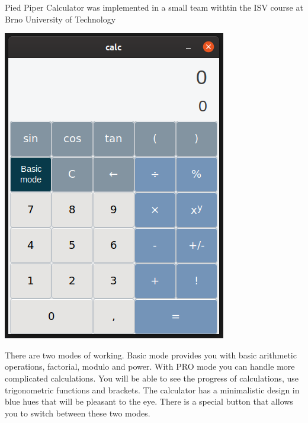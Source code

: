 Pied Piper Calculator was implemented in a small team withtin the I\+SV course at Brno University of Technology

 
\begin{DoxyImage}
\includegraphics[width=\textwidth,height=\textheight/2,keepaspectratio=true]{screenshot_pro.png}
\end{DoxyImage}
 There are two modes of working. Basic mode provides you with basic arithmetic operations, factorial, modulo and power. With P\+RO mode you can handle more complicated calculations. You will be able to see the progress of calculations, use trigonometric functions and brackets. The calculator has a minimalistic design in blue hues that will be pleasant to the eye. There is a special button that allows you to switch between these two modes.  
